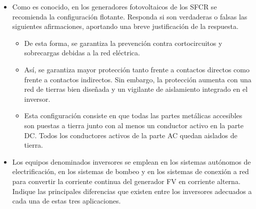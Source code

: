 \documentclass[article, a4paper]{memoir}
\begin{document}
\begin{itemize}
\item Como es conocido, en los generadores fotovoltaicos de los SFCR se
recomienda la configuración flotante. Responda si son verdaderas o
falsas las siguientes afirmaciones, aportando una breve
justificación de la respuesta.

\begin{itemize}
\item De esta forma, se garantiza la prevención contra cortocircuitos y
sobrecargas debidas a la red eléctrica.

\item Así, se garantiza mayor protección tanto frente a contactos directos
como frente a contactos indirectos. Sin embargo, la protección
aumenta con una red de tierras bien diseñada y un vigilante de
aislamiento integrado en el inversor.

\item Esta configuración consiste en que todas las partes metálicas
accesibles son puestas a tierra junto con al menos un conductor
activo en la parte DC. Todos los conductores activos de la parte AC
quedan aislados de tierra.
\end{itemize}

\item Los equipos denominados inversores se emplean en los sistemas
autónomos de electrificación, en los sistemas de bombeo y en los
sistemas de conexión a red para convertir la corriente continua del
generador FV en corriente alterna. Indique las principales
diferencias que existen entre los inversores adecuados a cada una de
estas tres aplicaciones.
\end{itemize}
\end{document}
